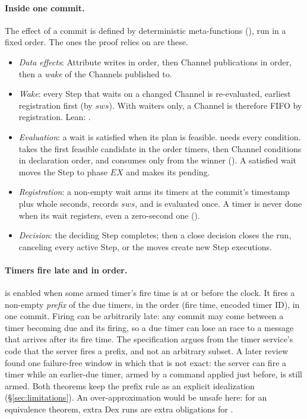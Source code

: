 \paragraph{Inside one commit.}
The effect of a commit is defined by deterministic meta-functions
(), run in a fixed order. The ones the proof
relies on are these.
\begin{itemize}
\item \emph{Data effects}: Attribute writes in order, then Channel
  publications in order, then a \emph{wake} of the Channels published to.
\item \emph{Wake}: every Step that waits on a changed Channel is
  re-evaluated, earliest registration first (by $\mathit{sws}$). With
   waiters only, a Channel is therefore FIFO by registration.
  Lean: .
\item \emph{Evaluation}: a wait is satisfied when its plan is feasible.
   needs every condition.  takes the first feasible
  candidate in the order timers, then Channel conditions in declaration
  order, and consumes only from the winner
  (). A satisfied wait moves the
  Step to phase $\mathit{EX}$ and makes its  pending.
\item \emph{Registration}: a non-empty wait arms its timers at the commit's
  timestamp plus whole seconds, records $\mathit{sws}$, and is evaluated
  once. A timer is never done when its wait registers, even a zero-second
  one ().
\item \emph{Decision}: the deciding Step completes; then a close decision
  closes the run, canceling every active Step, or the moves create new Step
  executions.
\end{itemize}

\paragraph{Timers fire late and in order.}
 is enabled when some armed timer's fire time is at or
before the clock. It fires a non-empty \emph{prefix} of the due timers, in
the order (fire time, encoded timer ID), in one commit. Firing can be
arbitrarily late: any commit may come between a timer becoming due and its
firing, so a due timer can lose an  race to a message that arrives
after its fire time. The specification argues from the timer service's code
that the server fires a prefix, and not an arbitrary subset. A later review
found one failure-free window in which that is not exact: the server can
fire a timer while an earlier-due timer, armed by a command applied just
before, is still armed. Both theorems keep the prefix rule as
an explicit idealization (\S\ref{sec:limitations}). An over-approximation
would be unsafe here: for an equivalence theorem, extra Dex runs are extra
obligations for \Lang{}.

